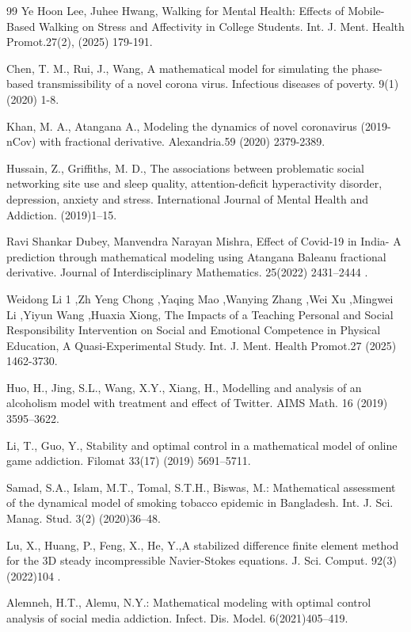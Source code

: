 \documentclass[10pt]{NSP1}
\begin{document}
\begin{thebibliography}{99}
Ye Hoon Lee, Juhee Hwang, Walking for Mental Health: Effects of Mobile-Based Walking on Stress and Affectivity in College Students. Int. J. Ment. Health Promot.27(2), (2025) 179-191.

Chen, T. M., Rui, J., Wang, A mathematical model for simulating the phase-based transmissibility of a novel corona virus. Infectious diseases of poverty. 9(1)(2020) 1-8.

Khan, M. A., Atangana A., Modeling the dynamics of novel coronavirus (2019-nCov) with fractional derivative. Alexandria.59 (2020) 2379-2389.

Hussain, Z., Griffiths, M. D., The associations between problematic social networking site use and sleep quality, attention-deficit hyperactivity disorder, depression, anxiety and stress. International Journal of Mental Health and Addiction. (2019)1–15.

Ravi Shankar Dubey, Manvendra Narayan Mishra, Effect of Covid-19 in India- A prediction through mathematical modeling using Atangana Baleanu fractional derivative. Journal of Interdisciplinary Mathematics. 25(2022) 2431–2444 .

Weidong Li 1 ,Zh Yeng Chong ,Yaqing Mao ,Wanying Zhang ,Wei Xu ,Mingwei Li ,Yiyun Wang ,Huaxia Xiong, The Impacts of a Teaching Personal and Social Responsibility Intervention on Social and Emotional Competence in Physical Education, A Quasi-Experimental Study. Int. J. Ment. Health Promot.27 (2025) 1462-3730.

Huo, H., Jing, S.L., Wang, X.Y., Xiang, H., Modelling and analysis of an alcoholism model with treatment and effect of Twitter. AIMS Math. 16 (2019) 3595–3622.

Li, T., Guo, Y., Stability and optimal control in a mathematical model of online game addiction. Filomat 33(17) (2019) 5691–5711.

Samad, S.A., Islam, M.T., Tomal, S.T.H., Biswas, M.: Mathematical assessment of the dynamical model of smoking tobacco epidemic in Bangladesh. Int. J. Sci. Manag. Stud. 3(2) (2020)36–48.

Lu, X., Huang, P., Feng, X., He, Y.,A stabilized difference finite element method for the 3D steady incompressible Navier-Stokes equations. J. Sci. Comput. 92(3) (2022)104 .

Alemneh, H.T., Alemu, N.Y.: Mathematical modeling with optimal control analysis of social media addiction. Infect. Dis. Model. 6(2021)405–419.


\end{thebibliography}
\end{document}
